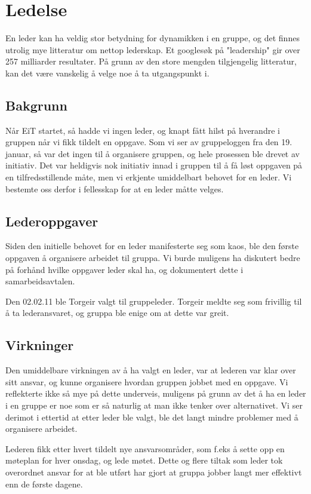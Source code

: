 \section{Ledelse}
En leder kan ha veldig stor betydning for dynamikken i en gruppe, og det finnes
utrolig mye litteratur om nettop lederskap. Et googlesøk på "leadership" gir
over 257 milliarder resultater.
På grunn av den store mengden tilgjengelig litteratur, kan det være vanskelig å velge noe å ta utgangspunkt i.

\subsection{Bakgrunn}
Når EiT startet, så hadde vi ingen leder, og knapt fått hilst på hverandre i
gruppen når vi fikk tildelt en oppgave. Som vi ser av gruppeloggen fra den 19.
januar, så var det ingen til å organisere gruppen, og hele prosessen ble drevet
av initiativ. Det var heldigvis nok initiativ innad i gruppen til å få løst
oppgaven på en tilfredsstillende måte, men vi erkjente umiddelbart behovet for
en leder. Vi bestemte oss derfor i fellesskap for at en leder måtte velges.

\subsection{Lederoppgaver}
Siden den initielle behovet for en leder manifesterte seg som kaos, ble den
første oppgaven å organisere arbeidet til gruppa.
Vi burde muligens ha diskutert bedre på forhånd hvilke oppgaver leder skal ha,
og dokumentert dette i samarbeidsavtalen.

Den 02.02.11 ble Torgeir valgt til gruppeleder. Torgeir meldte seg som frivillig
til å ta lederansvaret, og gruppa ble enige om at dette var greit.

\subsection{Virkninger}
Den umiddelbare virkningen av å ha valgt en leder, var at lederen var klar over
sitt ansvar, og kunne organisere hvordan gruppen jobbet med en oppgave. Vi 
reflekterte ikke så mye på dette underveis, muligens på grunn av det å ha en
leder i en gruppe er noe som er så naturlig at man ikke tenker over
alternativet. Vi ser derimot i ettertid at etter leder ble valgt, ble det langt
mindre problemer med å organisere arbeidet.

Lederen fikk etter hvert tildelt nye ansvarsområder, som f.eks å sette opp en
møteplan for hver onsdag, og lede møtet. Dette og flere tiltak som leder tok
overordnet ansvar for at ble utført har gjort at gruppa jobber langt mer
effektivt enn de første dagene.

